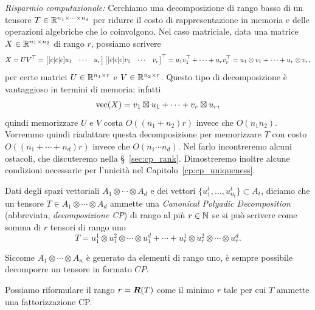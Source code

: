 \emph{Risparmio computazionale:} Cerchiamo una decomposizione di rango basso di un tensore $ T \in \Rmsiz! $ per ridurre il
costo di rappresentazione in memoria e delle operazioni algebriche che lo coinvolgono. Nel caso matriciale, data una
matrice $ X \in \mathbb{R}^{n_1\times n_2} $ di rango $ r $, possiamo scrivere
\[
	X = UV^{\top} = \begin{bmatrix}[c|c|c] u_1 & \cdots & u_r  \end{bmatrix}  \begin{bmatrix}[c|c|c]  v_1 & \cdots
                            & v_r\end{bmatrix}^{\top} =
	u_1v_1^{\top} + \cdots + u_rv_r^{\top} = u_1 \otimes v_1 + \cdots + u_r \otimes v_r
	,\] per certe matrici $ U \in \mathbb{R}^{n_1 \times r} $ e $ V \in \mathbb{R}^{n_2\times r} $. Questo tipo di
decomposizione è vantaggioso in termini di memoria: infatti
\[
	\operatorname{vec}(X) = v_1 \mathbin{\boxtimes} u_1 + \cdots + v_r \mathbin{\boxtimes} u_r
	,\] quindi memorizzare $ U $ e $ V $ costa $ O((n_1+n_2)r) $ invece che $ O(n_1n_2) $. Vorremmo
quindi riadattare questa decomposizione per memorizzare $ T $ con costo $ O((n_1+\cdots+n_d)r)
$ invece che $ O(n_1\cdots n_d) $. Nel farlo incontreremo alcuni
ostacoli, che discuteremo nella \S~\ref{sec:cp_rank}. Dimostreremo inoltre alcune condizioni
necessarie per l'unicità nel Capitolo~\ref{cp:cp_uniqueness}.

\begin{definition}
	\label{def:CP}
	Dati degli spazi vettoriali $ A_1 \otimes \cdots \otimes A_d $ e dei vettori $ \{u_1^t, \ldots,
		u_{n_{t}}^t\} \subset A_{t}  $, diciamo che un tensore $ T \in A_1 \otimes \cdots \otimes A_d $
	ammette una \emph{Canonical Polyadic Decomposition} (abbreviata, \emph{decomposizione CP}) di
	rango al più $ r \in \mathbb{N} $ se si può scrivere come somma di $ r $ tensori di rango uno
	\begin{equation*}
		T = u_1^1 \otimes u_1^2 \otimes \cdots \otimes u_1^d + \cdots + u_r^1 \otimes u_r^2 \otimes \cdots
		\otimes u_r^d.
	\end{equation*}
\end{definition}
\begin{remark}
	Siccome $ A_1 \otimes \cdots \otimes A_{n} $ è generato da elementi di rango uno, è sempre
	possibile decomporre un tensore in formato $ CP $.
\end{remark}
\begin{remark}
	Possiamo riformulare il rango $ r =\bm{R}(T) $ come il minimo $ r $ tale per cui $ T $ ammette una
	fattorizzazione CP.
\end{remark}


